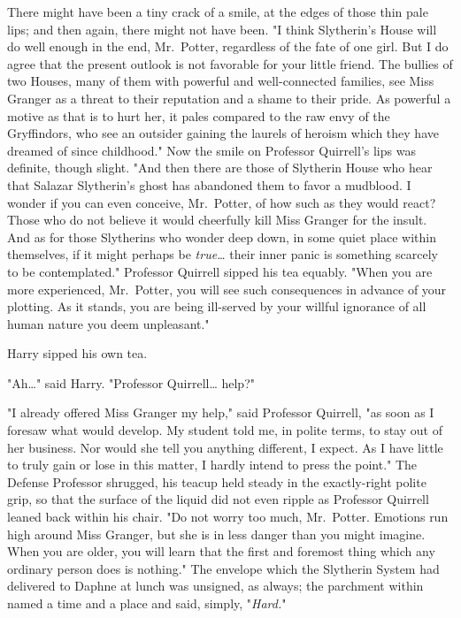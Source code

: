 There might have been a tiny crack of a smile, at the edges of those thin pale 
lips; and then again, there might not have been. "I think Slytherin's House 
will do well enough in the end, Mr.~Potter, regardless of the fate of one girl. 
But I do agree that the present outlook is not favorable for your little 
friend. The bullies of two Houses, many of them with powerful and 
well-connected families, see Miss Granger as a threat to their reputation and a 
shame to their pride. As powerful a motive as that is to hurt her, it pales 
compared to the raw envy of the Gryffindors, who see an outsider gaining the 
laurels of heroism which they have dreamed of since childhood." Now the smile 
on Professor Quirrell's lips was definite, though slight. "And then there are 
those of Slytherin House who hear that Salazar Slytherin's ghost has abandoned 
them to favor a mudblood. I wonder if you can even conceive, Mr.~Potter, of how 
such as they would react? Those who do not believe it would cheerfully kill 
Miss Granger for the insult. And as for those Slytherins who wonder deep down, 
in some quiet place within themselves, if it might perhaps be 
\emph{true{\ldots}} their inner panic is something scarcely to be 
contemplated." Professor Quirrell sipped his tea equably. "When you are more 
experienced, Mr.~Potter, you will see such consequences in advance of your 
plotting. As it stands, you are being ill-served by your willful ignorance of 
all human nature you deem unpleasant."

Harry sipped his own tea.

"Ah{\ldots}" said Harry. "Professor Quirrell{\ldots} help?"

"I already offered Miss Granger my help," said Professor Quirrell, "as soon as 
I foresaw what would develop. My student told me, in polite terms, to stay out 
of her business. Nor would she tell you anything different, I expect. As I have 
little to truly gain or lose in this matter, I hardly intend to press the 
point." The Defense Professor shrugged, his teacup held steady in the 
exactly-right polite grip, so that the surface of the liquid did not even 
ripple as Professor Quirrell leaned back within his chair. "Do not worry too 
much, Mr.~Potter. Emotions run high around Miss Granger, but she is in less 
danger than you might imagine. When you are older, you will learn that the 
first and foremost thing which any ordinary person does is nothing."
\sbreak
The envelope which the Slytherin System had delivered to Daphne at lunch was 
unsigned, as always; the parchment within named a time and a place and said, 
simply, "\emph{Hard.}"

